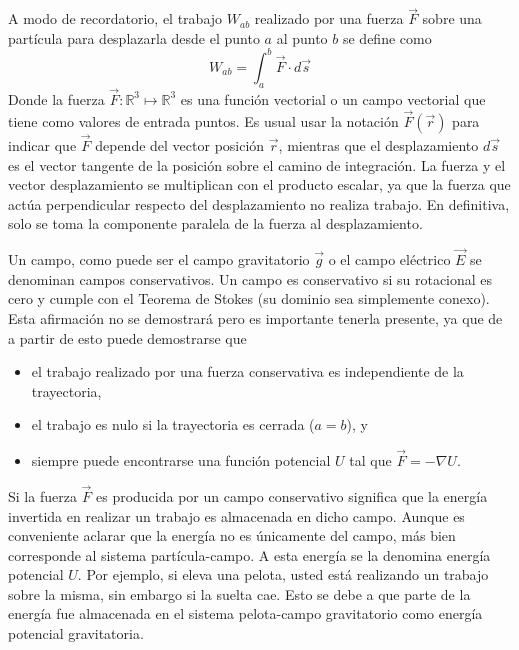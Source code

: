 \begin{tcolorbox}
  A modo de recordatorio, el trabajo \(W_{ab}\) realizado por una fuerza \(\vec{F}\) sobre una partícula para desplazarla desde el punto \(a\) al punto \(b\) se define como 
  \[
    W_{ab}=\int_a^b \vec{F}\cdot d\vec{s}
  \]
  Donde la fuerza \(\vec{F}:\mathbb{R}^3 \mapsto \mathbb{R}^3\) es una función vectorial o un campo vectorial que tiene como valores de entrada puntos. Es usual usar la notación \(\vec{F}(\vec{r})\) para indicar que \(\vec{F}\) depende del vector posición \(\vec{r}\), mientras que el desplazamiento \(d\vec{s}\) es el vector tangente de la posición sobre el camino de integración. La fuerza y el vector desplazamiento se multiplican con el producto escalar, ya que la fuerza que actúa perpendicular respecto del desplazamiento no realiza trabajo. En definitiva, solo se toma la componente paralela de la fuerza al desplazamiento.

  Un campo, como puede ser el campo gravitatorio \(\vec{g}\) o el campo eléctrico \(\vec{E}\) se denominan campos conservativos. Un campo es conservativo si su rotacional es cero y cumple con el Teorema de Stokes (su dominio sea simplemente conexo). Esta afirmación no se demostrará pero es importante tenerla presente, ya que de a partir de esto puede demostrarse que 
  \begin{itemize}
    \item el trabajo realizado por una fuerza conservativa es independiente de la trayectoria,
    \item el trabajo es nulo si la trayectoria es cerrada (\(a=b\)), y
    \item siempre puede encontrarse una función potencial \(U\) tal que \(\vec{F}=-\nabla U\).
  \end{itemize}

  Si la fuerza \(\vec{F}\) es producida por un campo conservativo significa que la energía invertida en realizar un trabajo es almacenada en dicho campo. Aunque es conveniente aclarar que la energía no es únicamente del campo, más bien corresponde al sistema partícula-campo. A esta energía se la denomina energía potencial \(U\). Por ejemplo, si eleva una pelota, usted está realizando un trabajo sobre la misma, sin embargo si la suelta cae. Esto se debe a que parte de la energía fue almacenada en el sistema pelota-campo gravitatorio como energía potencial gravitatoria.


\end{tcolorbox}
